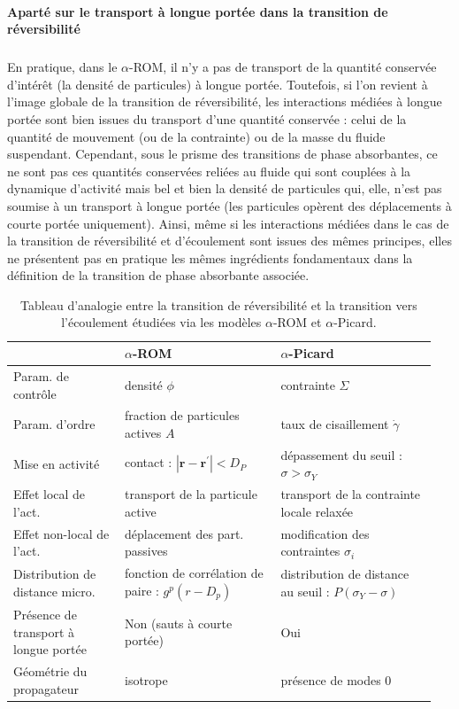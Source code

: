 \paragraph{Aparté sur le transport à longue portée dans la transition de réversibilité}

\subparagraph{}En pratique, dans le $\alpha$-ROM, il n'y a pas de transport de la quantité conservée d'intérêt (la densité de particules) à longue portée. Toutefois, si l'on revient à l'image globale de la transition de réversibilité, les interactions médiées à longue portée sont bien issues du transport d'une quantité conservée : celui de la quantité de mouvement (ou de la contrainte) ou de la masse du fluide suspendant. Cependant, sous le prisme des transitions de phase absorbantes, ce ne sont pas ces quantités conservées reliées au fluide qui sont couplées à la dynamique d'activité mais bel et bien la densité de particules qui, elle, n'est pas soumise à un transport à longue portée (les particules opèrent des déplacements à courte portée uniquement). Ainsi, même si les interactions médiées dans le cas de la transition de réversibilité et d'écoulement sont issues des mêmes principes, elles ne présentent pas en pratique les mêmes ingrédients fondamentaux dans la définition de la transition de phase absorbante associée.

\begingroup

\setlength{\tabcolsep}{10pt}
\renewcommand{\arraystretch}{1.5}

\begin{table}[h]
\centering
\begin{tabular}{P{0.25\linewidth}P{0.35\linewidth}P{0.35\linewidth}}
\hline \hline  & $\alpha$-ROM & $\alpha$-Picard \\
\hline
Param. de contrôle  & densité $\phi$ & contrainte $\Sigma$ \\
Param. d'ordre & fraction de particules actives $A$ & taux de cisaillement $\dot{\gamma}$ \\
Mise en activité & contact : $|\mathbf{r}-\mathbf{r}^\prime| < D_P$ & dépassement du seuil : $\sigma > \sigma_Y$\\
Effet local de l'act. & transport de la particule active & transport de la contrainte locale relaxée \\
Effet non-local de l'act. & déplacement des part. passives & modification des contraintes $\sigma_i$ \\
Distribution de distance micro.  & fonction de corrélation de paire : $g^p(r-D_p)$ & distribution de distance au seuil : $P(\sigma_Y - \sigma)$\\
\hline 
Présence de transport à longue portée & Non (sauts à courte portée) & Oui \\
Géométrie du propagateur & isotrope & présence de modes 0 \\
\hline \hline
\end{tabular}
\caption{Tableau d'analogie entre la transition de réversibilité et la transition vers l'écoulement étudiées via les modèles $\alpha$-ROM et $\alpha$-Picard.}
\label{tab:analogie}
\end{table}

